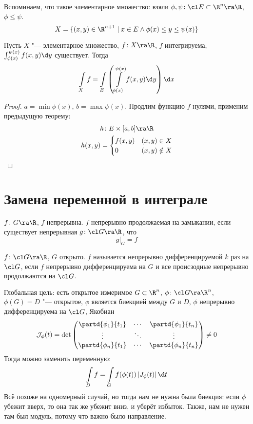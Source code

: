 \begin{Rem}
	Вспоминаем, что такое элементарное множество: взяли $\phi, \psi\colon \cl E \subset \R^n \ra \R$, $\phi \le \psi$.
	\[ X = \{ (x, y) \in \R^{n+1} \mid x \in E \land \phi(x) \le y \le \psi(x)\} \]
\end{Rem}
\begin{theorem}
	Пусть $X$ "--- элементарное множество, $f\colon X \ra \R$, $f$ интегрируема, $\int_{\phi(x)}^{\psi(x)} f(x, y) \d y$ существует.
	Тогда
	\[ \int\limits_X f = \int\limits_E \left( \int\limits_{\phi(x)}^{\psi(x)} f(x, y) \d y \right) \d x \]
\end{theorem}
\begin{proof}
	$a = \min \phi(x)$, $b = \max \psi(x)$.
	Продлим функцию $f$ нулями, применим предыдущую теорему:
	\begin{gather*}
		h\colon E \times [a, b] \ra \R \\
		h(x, y) = \begin{cases} f(x, y) & (x, y) \in X \\ 0 & (x, y) \notin X \end{cases}
	\end{gather*}
\end{proof}

\section{Замена переменной в интеграле}

\begin{Def}
	$f\colon G \ra \R$, $f$ непрерывна.
	$f$ непрерывно продолжаемая на замыкании, если существует непрерывная $g\colon \cl G \ra \R$, что
	\[ g \biggr|_G = f \]
\end{Def}

\begin{Def}
	$f\colon \cl G \ra \R$, $G$ открыто.
	$f$ называется непрерывно дифференцируемой $k$ раз на $\cl G$,
	если $f$ непрерывно дифференцируема на $G$ и все происзодные непрерывно продолжаются на $\cl G$.
\end{Def}

Глобальная цель: есть открытое измеримое $G \subset \R^n$, $\phi\colon \cl G \ra \R^n$,
$\phi(G) = D$ "--- открытое, $\phi$ является биекцией между $G$ и $D$, $\phi$ непрерывно дифференцируема на $\cl G$,
Якобиан
\[	\mathcal J_\phi(t) = \det \begin{pmatrix}
		\partd{\phi_1}{t_1} & \cdots & \partd{\phi_1}{t_n} \\
		\vdots & \ddots & \vdots \\
		\partd{\phi_n}{t_1} & \cdots & \partd{\phi_n}{t_n}
	\end{pmatrix} \ne 0
\]
Тогда можно заменить переменную:
\[
	\int\limits_D f = \int\limits_G f(\phi(t)) \left| J_\phi(t) \right| \d t
\]
Всё похоже на одномерный случай, но тогда нам не нужна была биекция: если $\phi$ убежит вверх, то она так же убежит вниз, и уберёт избыток.
Также, нам не нужен там был модуль, потому что важно было направление.
